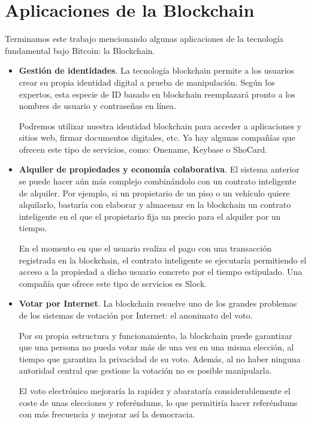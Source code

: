 \documentclass[twoside]{article}
\theoremstyle{definition}
\begin{document}
\section{Aplicaciones de la Blockchain}
Terminamos este trabajo mencionando algunas aplicaciones de la tecnología fundamental bajo Bitcoin: la Blockchain. 
\begin{itemize}
\item \textbf{Gestión de identidades}. La tecnología blockchain permite a los usuarios crear su propia identidad digital a prueba de manipulación. Según los expertos, esta especie de ID basado en blockchain reemplazará pronto a los nombres de usuario y contraseñas en línea.

Podremos utilizar nuestra identidad blockchain para acceder a aplicaciones y sitios web, firmar documentos digitales, etc. Ya hay algunas compañías que ofrecen este tipo de servicios, como: Onename, Keybase o ShoCard.

\item \textbf{Alquiler de propiedades y economía colaborativa}. El sistema anterior se puede hacer aún más complejo combinándolo con un contrato inteligente de alquiler. Por ejemplo, si un propietario de un piso o un vehículo quiere alquilarlo, bastaría con elaborar y almacenar en la blockchain un contrato inteligente en el que el propietario fija un precio para el alquiler por un tiempo.

En el momento en que el usuario realiza el pago con una transacción registrada en la blockchain, el contrato inteligente se ejecutaría permitiendo el acceso a la propiedad a dicho usuario concreto por el tiempo estipulado. Una compañía que ofrece este tipo de servicios es Slock.

\item\textbf{Votar por Internet}. La blockchain resuelve uno de los grandes problemas de los sistemas de votación por Internet: el anonimato del voto.

Por su propia estructura y funcionamiento, la blockchain puede garantizar que una persona no pueda votar más de una vez en una misma elección, al tiempo que garantiza la privacidad de su voto. Además, al no haber ninguna autoridad central que gestione la votación no es posible manipularla.

El voto electrónico mejoraría la rapidez y abarataría considerablemente el coste de unas elecciones y referéndums, lo que permitiría hacer referéndums con más frecuencia y mejorar así la democracia.

\end{itemize}
\end{document}
